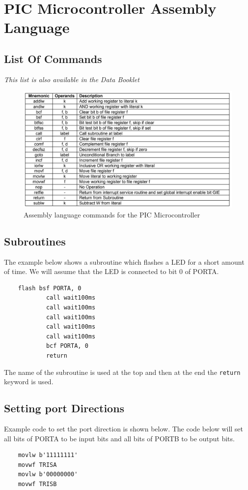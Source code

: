 \documentclass[a4paper,11pt, twocolumn]{article}
\begin{document}
\section{PIC Microcontroller Assembly Language}
\subsection{List Of Commands}
\textit{This list is also available in the Data Booklet}
\begin{figure}[H]
    \centering
    \includegraphics[width=\linewidth]{commands.jpg}
    \caption{Assembly language commands for the PIC Microcontroller}
\end{figure}
\subsection{Subroutines}
The example below shows a subroutine which flashes a LED for a short amount of time. We will assume that the LED is connected to bit 0 of PORTA.
\begin{verbatim}
    flash bsf PORTA, 0
            call wait100ms
            call wait100ms
            call wait100ms
            call wait100ms
            call wait100ms
            bcf PORTA, 0
            return
\end{verbatim}
The name of the subroutine is used at the top and then at the end the \verb|return| keyword is used. 
\subsection{Setting port Directions}
Example code to set the port direction is shown below. The code below will set all bits of PORTA to be input bits and all bits of PORTB to be output bits.
\begin{verbatim}
    movlw b'11111111'
    movwf TRISA
    movlw b'00000000'
    movwf TRISB
\end{verbatim}
\end{document}
